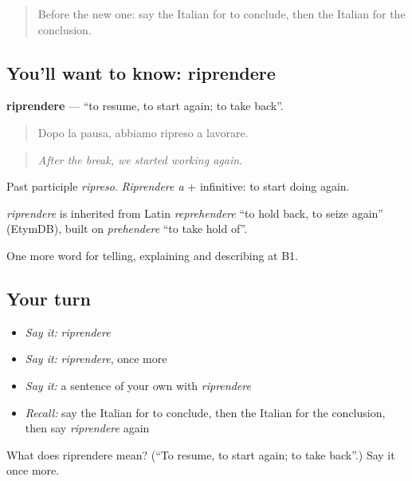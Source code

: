 \label{lesson:IT-C278-riprendere}



\begin{quote}
Before the new one: say the Italian for to conclude, then the Italian for the conclusion.
\end{quote}

\subsection*{You'll want to know: riprendere}
\textbf{riprendere} — \textquotedblleft{}to resume, to start again; to take back\textquotedblright{}.

\begin{quote}
Dopo la pausa, abbiamo ripreso a lavorare.
\end{quote}

\begin{quote}
\emph{After the break, we started working again.}
\end{quote}

Past participle \emph{ripreso}. \emph{Riprendere a} + infinitive: to start doing again.

\begin{cousinweb}
\emph{riprendere} is inherited from Latin \emph{reprehendere} \textquotedblleft{}to hold back, to seize again\textquotedblright{} (EtymDB), built on \emph{prehendere} \textquotedblleft{}to take hold of\textquotedblright{}.
\end{cousinweb}

\begin{grammarlens}[title={What you've built}]
One more word for telling, explaining and describing at B1.
\end{grammarlens}

\subsection*{Your turn}
\begin{itemize}
\raggedright
  \item \emph{Say it:} \emph{riprendere}
  \item \emph{Say it:} \emph{riprendere}, once more
  \item \emph{Say it:} a sentence of your own with \emph{riprendere}
  \item \emph{Recall:} say the Italian for to conclude, then the Italian for the conclusion, then say \emph{riprendere} again
\end{itemize}

\begin{tcolorbox}[breakable,colback=teal!4,colframe=teal!35!black,title={Before you move on}]
What does riprendere mean? (\textquotedblleft{}To resume, to start again; to take back\textquotedblright{}.) Say it once more.
\end{tcolorbox}
